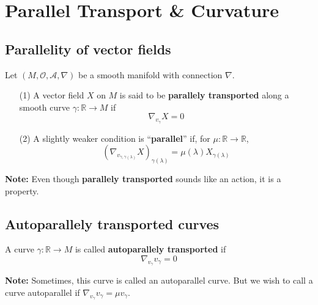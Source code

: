 \section{Parallel Transport \& Curvature}

\subsection{Parallelity of vector fields}
\begin{definition}
  Let $(M, \mathcal{O}, \mathcal{A}, \nabla)$ be a smooth manifold with connection $\nabla$.
  \begin{enumerate}
    \item[(1)] A vector field $X$ on $M$ is said to be \textbf{parallely transported} along a smooth curve $\gamma: \mathbb{R} \to M$ if 
      \begin{equation}
        \boxed{\nabla_{v_{\gamma}} X = 0}
      \end{equation}
    \item[(2)] A slightly weaker condition is ``\textbf{parallel}'' if, for $\mu : \mathbb{R} \to \mathbb{R}$,
      \begin{equation}
        \left(\nabla_{v_{\gamma, \gamma(\lambda)} } X\right)_{\gamma(\lambda)} = \mu(\lambda) X_{\gamma(\lambda)}
      \end{equation}
  \end{enumerate}
\end{definition}

\textbf{Note:} Even though \textbf{parallely transported} sounds like an action, it is a property.

\subsection{Autoparallely transported curves}
\begin{definition}
  A curve $\gamma: \mathbb{R} \to M$ is called \textbf{autoparallely transported} if 
  \begin{equation}
    \nabla_{v_{\gamma}}v_{\gamma} = 0
  \end{equation}
\end{definition}

\textbf{Note:} Sometimes, this curve is called an autoparallel curve. But we wish to call a curve autoparallel if $\nabla_{v_{\gamma}}v_{\gamma} = \mu v_{\gamma}$.

